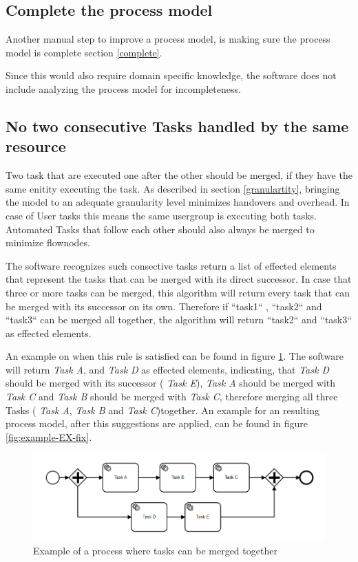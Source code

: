 \subsection{Complete the process model}
Another manual step to improve a process model, is making sure the process model is complete section \ref{complete}.

Since this would also require domain specific knowledge, the software does not include analyzing the process model for incompleteness.

\subsection{No two consecutive Tasks handled by the same resource}\label{merge-section}
Two task that are executed one after the other should be merged, if they have the same enitity executing the task. As described in section \ref{granulartity}, bringing the model to an adequate granularity level minimizes handovers and overhead. In case of User tasks this means the same usergroup is executing both tasks. Automated Tasks that follow each other should also always be merged to minimize flownodes.


The software recognizes such consective tasks return a list of effected elements that represent the tasks that can be merged with its direct successor. In case that three or more tasks can be merged, this algorithm will return every task that can be merged with its successor on its own. Therefore if ``task1`` , ``task2`` and ``task3`` can be merged all together, the algorithm will return ``task2`` and ``task3`` as effected elements.

An example on when this rule is satisfied can be found in figure \ref{fig:example-EX}. The software will return \textit{Task A},  and \textit{Task D} as effected elements, indicating, that  \textit{Task D} should be merged with its successor ( \textit{Task E}),  \textit{Task A} should be merged with  \textit{Task C} and  \textit{Task B} should be merged with  \textit{Task C}, therefore merging all three Tasks ( \textit{Task A}, \textit{Task B} and  \textit{Task C})together. An example for an resulting process model, after this suggestions are applied, can be found in figure \ref{fig:example-EX-fix}.

\begin{figure}[H]
	\centering
	\includegraphics[width=0.9\columnwidth]{graphics/merge-suggestion-1}
	\caption{Example of a process where tasks can be merged together} 
	\label{fig:example-EX} 
\end{figure}

